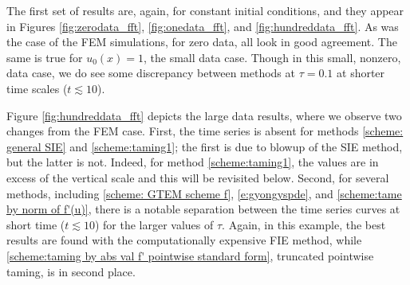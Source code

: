 \documentclass[reqno, 11pt]{amsart}
\newcommand{\gsnote}[1]{\textcolor{Cerulean}{#1}}
\theoremstyle{plain}
\theoremstyle{definition}
\theoremstyle{remark}
\numberwithin{equation}{section}
\numberwithin{theorem}{section}
\begin{document}
{%

The first set of results are, again, for constant initial conditions, and they appear in Figures \ref{fig:zerodata_fft}, \ref{fig:onedata_fft}, and \ref{fig:hundreddata_fft}.  As was the case of the FEM simulations, for zero data, all look in good agreement.  The same is true for $u_0(x) = 1$, the small data case.  Though in this small, nonzero, data case, we do see some discrepancy between methods at $\tau =0.1$ at shorter time scales ($t\lesssim 10$).



Figure \ref{fig:hundreddata_fft} depicts the large data results, where we observe two changes from the FEM case. First, the time series is absent for methods \eqref{scheme: general SIE}  and \eqref{scheme:taming1}; the first is due to blowup of the SIE method, but the latter is not. Indeed, for method \eqref{scheme:taming1}, the values are in excess of the vertical scale and this will be revisited below.  Second, for several methods, including  \eqref{scheme: GTEM scheme f}, \eqref{e:gyongyspde}, and \eqref{scheme:tame by norm of f'(u)}, there is a notable separation between the time series curves at short time ($t\lesssim 10$) for the larger values of $\tau$.   Again, in this example, the best results are found with the computationally expensive FIE method, while \eqref{scheme:taming by abs val f' pointwise standard form}, truncated pointwise taming, is in second place.

}
\end{document}
